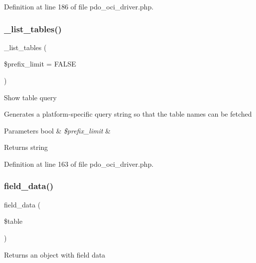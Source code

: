 Definition at line 186 of file pdo\+\_\+oci\+\_\+driver.\+php.

\mbox{\label{class_c_i___d_b__pdo__oci__driver_a435c0f3ce54fe7daa178baa8532ebd54}} 
\subsubsection{\texorpdfstring{\_list\_tables()}{\_list\_tables()}}
{\footnotesize\ttfamily \+\_\+list\+\_\+tables (\begin{DoxyParamCaption}\item[{}]{\$prefix\+\_\+limit = {\ttfamily FALSE} }\end{DoxyParamCaption})\hspace{0.3cm}{\ttfamily [protected]}}

Show table query

Generates a platform-\/specific query string so that the table names can be fetched


\begin{DoxyParams}[1]{Parameters}
bool & {\em \$prefix\+\_\+limit} & \\
\hline
\end{DoxyParams}
\begin{DoxyReturn}{Returns}
string 
\end{DoxyReturn}


Definition at line 163 of file pdo\+\_\+oci\+\_\+driver.\+php.

\mbox{\label{class_c_i___d_b__pdo__oci__driver_a90355121e1ed009e0efdbd544ab56efa}} 
\subsubsection{\texorpdfstring{field\_data()}{field\_data()}}
{\footnotesize\ttfamily field\+\_\+data (\begin{DoxyParamCaption}\item[{}]{\$table }\end{DoxyParamCaption})}

Returns an object with field data


